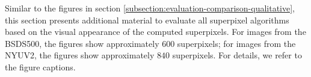 \newpage
Similar to the figures in section \ref{subsection:evaluation-comparison-qualitative}, this section presents additional material to evaluate all superpixel algorithms based on the visual appearance of the computed superpixels. For images from the BSDS500, the figures show approximately $600$ superpixels; for images from the NYUV2, the figures show approximately $840$ superpixels. For details, we refer to the figure captions.
\begin{figure}
	\centering
\end{figure}
